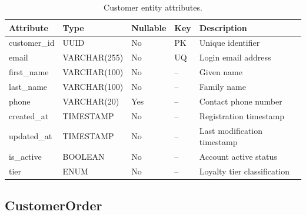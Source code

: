 \documentclass[
    language=english,
    doctype=data-dictionary,
    institution=none,
]{../../omnilatex}
\begin{document}
\begin{table}[h]
    \centering
    \begin{tabular}{llllp{3.5cm}}
        \toprule
        \textbf{Attribute} & \textbf{Type} & \textbf{Nullable} & \textbf{Key} & \textbf{Description} \\
        \midrule
        customer\_id & UUID & No & PK & Unique identifier \\
        email & VARCHAR(255) & No & UQ & Login email address \\
        first\_name & VARCHAR(100) & No & -- & Given name \\
        last\_name & VARCHAR(100) & No & -- & Family name \\
        phone & VARCHAR(20) & Yes & -- & Contact phone number \\
        created\_at & TIMESTAMP & No & -- & Registration timestamp \\
        updated\_at & TIMESTAMP & No & -- & Last modification timestamp \\
        is\_active & BOOLEAN & No & -- & Account active status \\
        tier & ENUM & No & -- & Loyalty tier classification \\
        \bottomrule
    \end{tabular}
    \caption{Customer entity attributes.}
\end{table}

\subsection{CustomerOrder}
\end{document}
